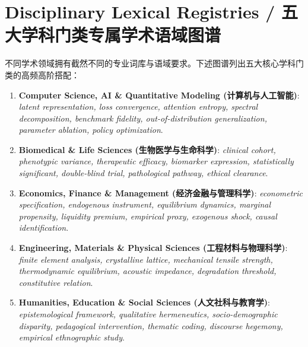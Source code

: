\section{Disciplinary Lexical Registries / 五大学科门类专属学术语域图谱}
不同学术领域拥有截然不同的专业词库与语域要求。下述图谱列出五大核心学科门类的高频高阶搭配：
\begin{enumerate}[label=\textbf{\color{AcadNavy}Domain \Roman*:}, leftmargin=2em]
  \item \textbf{Computer Science, AI \& Quantitative Modeling (计算机与人工智能)}: \textit{latent representation, loss convergence, attention entropy, spectral decomposition, benchmark fidelity, out-of-distribution generalization, parameter ablation, policy optimization}.
  \item \textbf{Biomedical \& Life Sciences (生物医学与生命科学)}: \textit{clinical cohort, phenotypic variance, therapeutic efficacy, biomarker expression, statistically significant, double-blind trial, pathological pathway, ethical clearance}.
  \item \textbf{Economics, Finance \& Management (经济金融与管理科学)}: \textit{econometric specification, endogenous instrument, equilibrium dynamics, marginal propensity, liquidity premium, empirical proxy, exogenous shock, causal identification}.
  \item \textbf{Engineering, Materials \& Physical Sciences (工程材料与物理科学)}: \textit{finite element analysis, crystalline lattice, mechanical tensile strength, thermodynamic equilibrium, acoustic impedance, degradation threshold, constitutive relation}.
  \item \textbf{Humanities, Education \& Social Sciences (人文社科与教育学)}: \textit{epistemological framework, qualitative hermeneutics, socio-demographic disparity, pedagogical intervention, thematic coding, discourse hegemony, empirical ethnographic study}.
\end{enumerate}
